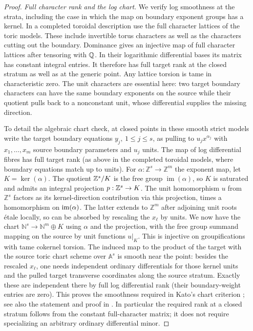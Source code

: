 \begin{proof}
\emph{Full character rank and the log chart.}
We verify log smoothness at the strata, including the case in which the
map on boundary exponent groups has a kernel.
In a completed toroidal description use the full character lattices of
the toric models.  These include invertible torus characters as well as
the characters cutting out the boundary.  Dominance gives an injective
map of full character lattices after tensoring with \(\mathbb Q\).  In their
logarithmic differential bases its matrix has constant integral
entries.  It therefore has full target rank at the closed stratum as
well as at the generic point.  Any lattice torsion is tame in
characteristic zero.  The unit characters are essential here: two
target boundary characters can have the same boundary exponents on the
source while their quotient pulls back to a nonconstant unit, whose
differential supplies the missing direction.

To detail the algebraic chart check, at closed points in these smooth strict models write the target boundary equations \(y_j,\ 1\le j\le s\), as pulling to \(u_j x^{\alpha_j}\) with \(x_1,\ldots,x_m\) source boundary parameters and \(u_j\) units.
The map of log differential fibres has full target rank (as above in the completed toroidal models, where boundary equations match up to units).
For \(\alpha:\mathbb Z^s\to\mathbb Z^m\) the exponent map, let
\(K=\ker(\alpha)\).
The quotient \(\mathbb Z^s/K\) is the free group \(\operatorname{im}(\alpha)\),
so \(K\) is saturated and admits an integral projection
\(p:\mathbb Z^s\to K\).
The unit homomorphism \(u\) from \(\mathbb Z^s\) factors as its kernel-direction contribution via this projection, times a homomorphism on \({\rm im}(\alpha)\).
The latter extends to \(\mathbb Z^m\) after adjoining unit roots \'etale locally, so can be absorbed by rescaling the \(x_\ell\) by units.
We now have the chart \(\mathbb N^s\to \mathbb N^m\oplus K\) using \(\alpha\) and the projection, with the free group summand mapping on the source by unit functions \(u|_K\).
This is injective on groupifications with tame cokernel torsion.
The induced map to the product of the target with the source toric chart scheme over \(\mathbb A^s\) is smooth near the point: besides the rescaled \(x_\ell\), one needs independent ordinary differentials for those kernel units and the pulled target transverse coordinates along the source stratum.
Exactly these are independent there by full log differential rank (their boundary-weight entries are zero).
This proves the smoothness required in Kato's chart criterion
\cite[Theorem~3.5 and Remark~3.6]{KatoLog}; see also the statement and
proof in \cite[Theorem~4.1, Remark~4.2 and Section~6]{FumiharuKatoLog}.
In particular the required rank at a closed stratum follows from the
constant full-character matrix; it does not require specializing an
arbitrary ordinary differential minor.


\end{proof}
